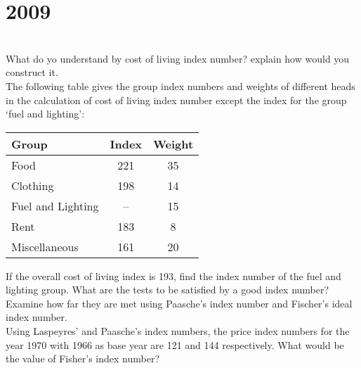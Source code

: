 \section*{2009}
\vspace{-.5cm}
\hrulefill \smallskip\\
 What do yo understand by cost of living index number? explain how would you construct it. \\ The following table gives the group index numbers and weights of different heads in the calculation of cost of living index number except the index for the group `fuel and lighting':
 \begin{center}
    \begin{tabular}{l*{2}{c}}\hline
    Group & Index & Weight \\ \hline
    Food & 221 & 35\\
    Clothing & 198 & 14 \\
    Fuel and Lighting & -- & 15 \\
    Rent & 183 & 8 \\
    Miscellaneous & 161 & 20 \\ \hline
    \end{tabular}
\end{center} If the overall cost of living index is 193, find the index number of the fuel and lighting group.
\myline
{} What are the tests to be satisfied by a good index number? Examine how far they are met using Paasche's index number and Fischer's ideal index number.\\Using Laspeyres' and Paasche's index numbers, the price index numbers for the year 1970 with 1966 as base year are 121 and 144 respectively. What would be the value of Fisher's index number?
